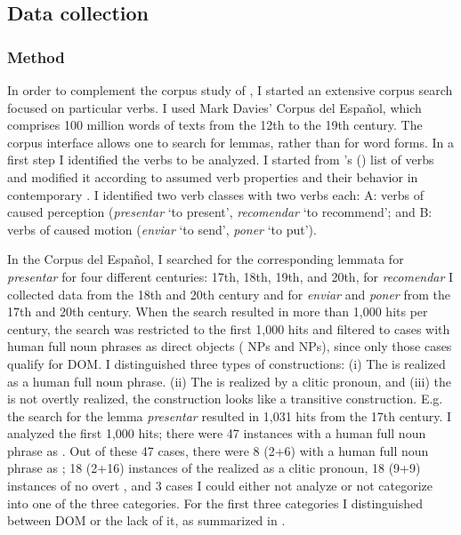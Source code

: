 \documentclass[output=paper]{LSP/langsci}
\begin{document}
\subsection{Data collection}\label{11-subsec:4-2}
 
\subsubsection{Method} \label{11-subsubsec:4-2-1}

In order to complement the corpus study of \citet{Ortiz2005Objetos,Ortiz2011Construcciones}, I started an extensive corpus search focused on particular verbs. I used Mark Davies’ Corpus del Español, which comprises 100 million words of  texts from the 12th to the 19th century. The corpus interface allows one to search for lemmas, rather than for word forms. In a first step I identified the verbs to be analyzed. I started from \citeauthor{Ortiz2011Construcciones}'s  (\citeyear{Ortiz2005Objetos,Ortiz2011Construcciones}) list of verbs and modified it according to assumed verb properties and their behavior in contemporary . I identified two verb classes with two verbs each: A: verbs of caused perception (\textit{presentar} ‘to present’, \textit{recomendar} ‘to recommend’; and B: verbs of caused motion (\textit{enviar} ‘to send’, \textit{poner} ‘to put’). 

In the Corpus del Español, I searched for the corresponding lemmata for \textit{presentar} for four different centuries: 17th, 18th, 19th, and 20th, for \textit{recomendar} I collected data from the 18th and 20th century and for \textit{enviar} and \textit{poner} from the 17th and 20th century. When the search resulted in more than 1,000 hits per century, the search was restricted to the first 1,000 hits and filtered to cases with human full noun phrases as direct objects ( NPs and  NPs), since only those cases qualify for DOM. I distinguished three types of constructions: (i) The  is realized as a human full noun phrase. (ii) The  is realized by a clitic pronoun, and (iii) the  is not overtly realized, \ie the construction looks like a transitive construction. E.g. the search for the lemma \textit{presentar} resulted in 1,031 hits from the 17th century. I analyzed the first 1,000 hits; there were 47 instances with a human full noun phrase as . Out of these 47 cases, there were 8 (2+6) with a human full noun phrase as ; 18 (2+16) instances of the  realized as a clitic pronoun, 18 (9+9) instances of no overt , and 3 cases I could either not analyze or not categorize into one of the three categories. For the first three categories I distinguished between DOM or the lack of it, as summarized in .
\end{document}

